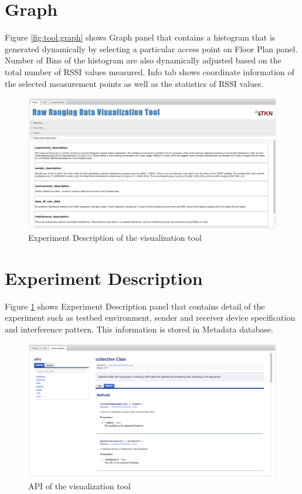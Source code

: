 \documentclass[11pt,a4paper,headinclude,footinclude,chapterprefix=on]{scrreprt}
\begin{document}
\section{Graph} Figure \ref{fig:tool:graph} shows Graph panel that contains a histogram that is generated dynamically by selecting a particular access point on Floor Plan panel. Number of Bins of the histogram are also dynamically adjusted based on the total number of RSSI values measured. Info tab shows coordinate information of the selected measurement points as well as the statistics of RSSI values. 
\begin{figure}
	[!h] \centering 
	\includegraphics[width=13cm]{Images/tool_des.png} \caption{Experiment Description of the visualization tool} \label{fig:tool:des} 
\end{figure}

\section{Experiment Description} Figure \ref{fig:tool:des} shows Experiment Description panel that contains detail of the experiment such as testbed environment, sender and receiver device specification and interference pattern. This information is stored in Metadata database. 
\begin{figure}
	[!h] \centering 
	\includegraphics[width=13cm]{Images/tool_jsDoc.png} \caption{API of the visualization tool} \label{fig:tool:jsDoc} 
\end{figure}
\end{document}
